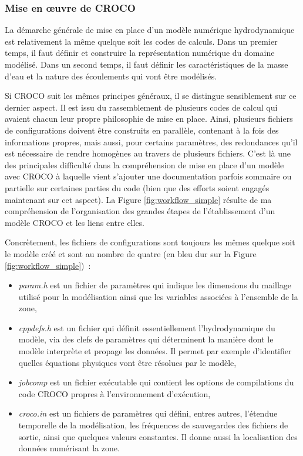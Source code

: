 \documentclass[10pt,a4paper,titlepage]{article}
\begin{document}
\subsubsection{Mise en \oe{}uvre de CROCO}
\label{subsub:presentation_generale}

La démarche générale de mise en place d'un modèle numérique hydrodynamique est relativement la même quelque soit les codes de calculs. Dans un premier temps, il faut définir et construire la représentation numérique du domaine modélisé. Dans un second temps, il faut définir les caractéristiques de la masse d'eau et la nature des écoulements qui vont être modélisés.

Si CROCO suit les mêmes principes généraux, il se distingue sensiblement sur ce dernier aspect. Il est issu du rassemblement de plusieurs codes de calcul qui avaient chacun leur propre philosophie de mise en place.  Ainsi, plusieurs fichiers de configurations doivent être construits en parallèle, contenant à la fois des informations propres, mais aussi, pour certains paramètres, des redondances qu'il est nécessaire de rendre homogènes au travers de plusieurs fichiers. C'est là une des principales difficulté dans la compréhension de mise en place d'un modèle avec CROCO à laquelle vient s'ajouter une documentation parfois sommaire ou partielle sur certaines parties du code (bien que des efforts soient engagés maintenant sur cet aspect). La Figure \ref{fig:workflow_simple} résulte de ma compréhension de l'organisation des grandes étapes de l'établissement d'un modèle CROCO et les liens entre elles.

Concrètement, les fichiers de configurations sont toujours les mêmes quelque soit le modèle créé et sont au nombre de quatre (en bleu dur sur la Figure \ref{fig:workflow_simple})~:
\begin{itemize}
    \item \textit{param.h} est un fichier de paramètres qui indique les dimensions du maillage utilisé pour la modélisation ainsi que les variables associées à l'ensemble de la zone,
    \item \textit{cppdefs.h} est un fichier qui définit essentiellement l'hydrodynamique du modèle, via des clefs de paramètres qui déterminent la manière dont le modèle interprète et propage les données. Il permet par exemple d'identifier quelles équations physiques vont être résolues par le modèle,
    \item \textit{jobcomp} est un fichier exécutable qui contient les options de compilations du code CROCO propres à l'environnement d’exécution,
    \item \textit{croco.in} est un fichiers de paramètres qui défini, entres autres, l'étendue temporelle de la modélisation, les fréquences de sauvegardes des fichiers de sortie, ainsi que quelques valeurs constantes. Il donne aussi la localisation des données numérisant la zone.
\end{itemize}
\end{document}
